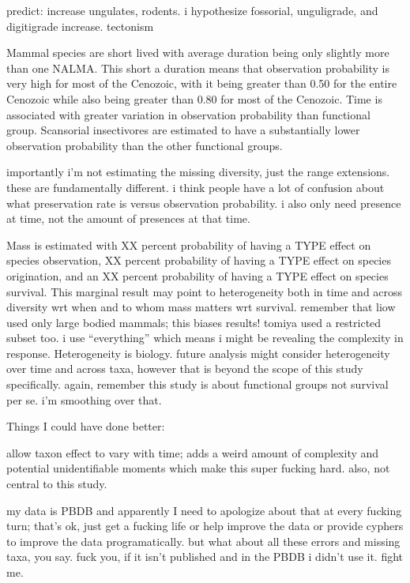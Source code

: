 \documentclass[12pt,letterpaper]{article}
\begin{document}
predict: increase ungulates, rodents. i hypothesize fossorial, unguligrade, and digitigrade increase. tectonism



Mammal species are short lived with average duration being only slightly more than one NALMA. This short a duration means that observation probability is very high for most of the Cenozoic, with it being greater than 0.50 for the entire Cenozoic while also being greater than 0.80 for most of the Cenozoic. Time is associated with greater variation in observation probability than functional group. Scansorial insectivores are estimated to have a substantially lower observation probability than the other functional groups.

importantly i'm not estimating the missing diversity, just the range extensions. these are fundamentally different. i think people have a lot of confusion about what preservation rate is versus observation probability. i also only need presence at time, not the amount of presences at that time.



Mass is estimated with XX percent probability of having a TYPE effect on species observation, XX percent probability of having a TYPE effect on species origination, and an XX percent probability of having a TYPE effect on species survival. This marginal result may point to heterogeneity both in time and across diversity wrt when and to whom mass matters wrt survival. remember that liow used only large bodied mammals; this biases results! tomiya used a restricted subset too. i use ``everything'' which means i might be revealing the complexity in response. Heterogeneity is biology. future analysis might consider heterogeneity over time and across taxa, however that is beyond the scope of this study specifically. again, remember this study is about functional groups not survival per se. i'm smoothing over that.






Things I could have done better: 

allow taxon effect to vary with time; adds a weird amount of complexity and potential unidentifiable moments which make this super fucking hard. also, not central to this study. 

my data is PBDB and apparently I need to apologize about that at every fucking turn; that's ok, just get a fucking life or help improve the data or provide cyphers to improve the data programatically. but what about all these errors and missing taxa, you say. fuck you, if it isn't published and in the PBDB i didn't use it. fight me.
\end{document}
